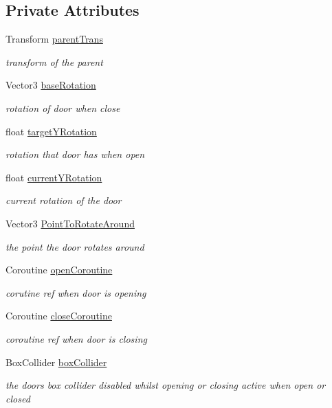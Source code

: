\subsection*{Private Attributes}
\begin{DoxyCompactItemize}
\item 
Transform \mbox{\hyperlink{class_single_hinge_door_a11558ae80f3e4b73b10872c16e37d411}{parent\+Trans}}
\begin{DoxyCompactList}\small\item\em transform of the parent \end{DoxyCompactList}\item 
Vector3 \mbox{\hyperlink{class_single_hinge_door_af4ee5d93ff333b25ba9e9555ae6911b7}{base\+Rotation}}
\begin{DoxyCompactList}\small\item\em rotation of door when close \end{DoxyCompactList}\item 
float \mbox{\hyperlink{class_single_hinge_door_ad7088149f79d6d1834f30b63634a7794}{target\+Y\+Rotation}}
\begin{DoxyCompactList}\small\item\em rotation that door has when open \end{DoxyCompactList}\item 
float \mbox{\hyperlink{class_single_hinge_door_ab99dc842767a0d88cdf75137d51161eb}{current\+Y\+Rotation}}
\begin{DoxyCompactList}\small\item\em current rotation of the door \end{DoxyCompactList}\item 
Vector3 \mbox{\hyperlink{class_single_hinge_door_a19b06c100fb6addbc4581a4b8e1ac82a}{Point\+To\+Rotate\+Around}}
\begin{DoxyCompactList}\small\item\em the point the door rotates around \end{DoxyCompactList}\item 
Coroutine \mbox{\hyperlink{class_single_hinge_door_a5a60ac7c32f52c7c698543a9ab961078}{open\+Coroutine}}
\begin{DoxyCompactList}\small\item\em corutine ref when door is opening \end{DoxyCompactList}\item 
Coroutine \mbox{\hyperlink{class_single_hinge_door_aa313b783db03dc2ca95a49dfcb001d64}{close\+Coroutine}}
\begin{DoxyCompactList}\small\item\em coroutine ref when door is closing \end{DoxyCompactList}\item 
Box\+Collider \mbox{\hyperlink{class_single_hinge_door_ab70e6007764e1391e7b8be75b988dadd}{box\+Collider}}
\begin{DoxyCompactList}\small\item\em the doors box collider disabled whilst opening or closing active when open or closed \end{DoxyCompactList}\end{DoxyCompactItemize}

